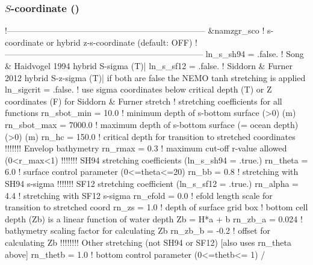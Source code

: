 \documentclass[../main/NEMO_manual]{subfiles}
\begin{document}
\subsubsection[$S$-coordinate (\forcode{ln_sco})]{$S$-coordinate (\protect{})}
\label{sec:DOMCFG_sco}

\begin{listing}
  \caption{}
  \label{lst:namzgr_sco_domcfg}
  \begin{forlines}
!-----------------------------------------------------------------------
&namzgr_sco    !   s-coordinate or hybrid z-s-coordinate                (default: OFF)
!-----------------------------------------------------------------------
   ln_s_sh94   = .false.    !  Song & Haidvogel 1994 hybrid S-sigma   (T)|
   ln_s_sf12   = .false.   !  Siddorn & Furner 2012 hybrid S-z-sigma (T)| if both are false the NEMO tanh stretching is applied
   ln_sigcrit  = .false.   !  use sigma coordinates below critical depth (T) or Z coordinates (F) for Siddorn & Furner stretch
                           !  stretching coefficients for all functions
   rn_sbot_min =   10.0    !  minimum depth of s-bottom surface (>0) (m)
   rn_sbot_max = 7000.0    !  maximum depth of s-bottom surface (= ocean depth) (>0) (m)
   rn_hc       =  150.0    !  critical depth for transition to stretched coordinates
                        !!!!!!!  Envelop bathymetry
   rn_rmax     =    0.3    !  maximum cut-off r-value allowed (0<r_max<1)
                        !!!!!!!  SH94 stretching coefficients  (ln_s_sh94 = .true.)
   rn_theta    =    6.0    !  surface control parameter (0<=theta<=20)
   rn_bb       =    0.8    !  stretching with SH94 s-sigma
                        !!!!!!!  SF12 stretching coefficient  (ln_s_sf12 = .true.)
   rn_alpha    =    4.4    !  stretching with SF12 s-sigma
   rn_efold    =    0.0    !  efold length scale for transition to stretched coord
   rn_zs       =    1.0    !  depth of surface grid box
                           !  bottom cell depth (Zb) is a linear function of water depth Zb = H*a + b
   rn_zb_a     =    0.024  !  bathymetry scaling factor for calculating Zb
   rn_zb_b     =   -0.2    !  offset for calculating Zb
                        !!!!!!!! Other stretching (not SH94 or SF12) [also uses rn_theta above]
   rn_thetb    =    1.0    !  bottom control parameter  (0<=thetb<= 1)
/
  \end{forlines}
\end{listing}
\end{document}
